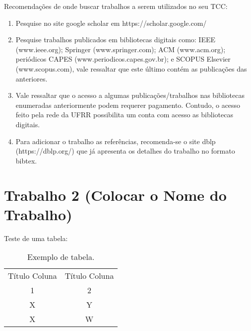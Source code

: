 Recomendações de onde buscar trabalhos a serem utilizados no seu TCC:
\begin{enumerate}
    \item Pesquise no site google scholar em https://scholar.google.com/
    \item Pesquise trabalhos publicados em bibliotecas digitais como: IEEE (www.ieee\allowbreak{}.org); Springer (www.springer.com); ACM (www.acm.org); periódicos CAPES (www.periodicos.capes.gov.br); e SCOPUS Elsevier (www.scopus.com), vale ressaltar que este último contém as publicações das anteriores.
    \item Vale ressaltar que o acesso a algumas publicações/trabalhos nas bibliotecas enumeradas anteriormente podem requerer pagamento. Contudo, o acesso feito pela rede da UFRR possibilita um conta com acesso as bibliotecas digitais.
    \item Para adicionar o trabalho as referências, recomenda-se o site dblp (https://dblp.org/) que já apresenta os detalhes do trabalho no formato bibtex.
\end{enumerate}

	
\section{Trabalho 2 (Colocar o Nome do Trabalho)}


Teste de uma tabela:

\begin{table}[htbp]
	\caption{Exemplo de tabela.}
	\label{tabela-ssentido}
	\begin{center}
	\begin{tabular}{|c|c|}
		\hline
		Título Coluna & Título Coluna \\
		1 & 2 \\
		\hline
		X & Y \\
		\hline
		X & W \\
		\hline
	\end{tabular}
	\end{center}
\end{table}
		
